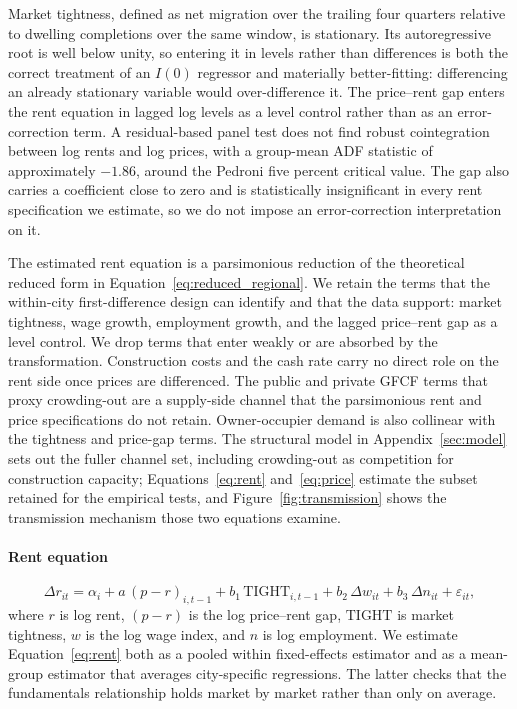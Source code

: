 \documentclass[preprint,11pt,authoryear]{elsarticle}
\begin{document}
Market tightness, defined as net migration over the trailing four
quarters relative to dwelling completions over the same window, is
stationary. Its autoregressive root is well below unity, so entering it
in levels rather than differences is both the correct treatment of an
$I(0)$ regressor and materially better-fitting: differencing an already
stationary variable would over-difference it. The price--rent gap enters
the rent equation in lagged log levels as a level control rather than as
an error-correction term. A residual-based panel test does not find
robust cointegration between log rents and log prices, with a group-mean
ADF statistic of approximately $-1.86$, around the Pedroni five percent
critical value. The gap also carries a coefficient close to zero and is
statistically insignificant in every rent specification we estimate, so
we do not impose an error-correction interpretation on it.

The estimated rent equation is a parsimonious reduction of the
theoretical reduced form in Equation~\ref{eq:reduced_regional}. We retain
the terms that the within-city first-difference design can identify and
that the data support: market tightness, wage growth, employment growth,
and the lagged price--rent gap as a level control. We drop terms that
enter weakly or are absorbed by the transformation. Construction costs
and the cash rate carry no direct role on the rent side once prices are
differenced. The public and private GFCF terms that proxy crowding-out
are a supply-side channel that the parsimonious rent and price
specifications do not retain. Owner-occupier demand is also collinear
with the tightness and price-gap terms. The structural model in
Appendix~\ref{sec:model} sets out the fuller channel set, including
crowding-out as competition for construction capacity;
Equations~\ref{eq:rent} and~\ref{eq:price} estimate the subset retained
for the empirical tests, and Figure~\ref{fig:transmission} shows the
transmission mechanism those two equations examine.

\paragraph{Rent equation}

\begin{equation}
\label{eq:rent}
\Delta r_{it} = \alpha_i + a\,(p-r)_{i,t-1}
 + b_1\,\text{TIGHT}_{i,t-1} + b_2\,\Delta w_{it}
 + b_3\,\Delta n_{it} + \varepsilon_{it},
\end{equation}
where $r$ is log rent, $(p-r)$ is the log price--rent gap,
$\text{TIGHT}$ is market tightness, $w$ is the log wage index, and $n$ is
log employment. We estimate Equation~\ref{eq:rent} both as a pooled
within fixed-effects estimator and as a mean-group estimator
\citep{pesaran1995estimating} that averages city-specific regressions.
The latter checks that the fundamentals relationship holds market by
market rather than only on average.
\end{document}
